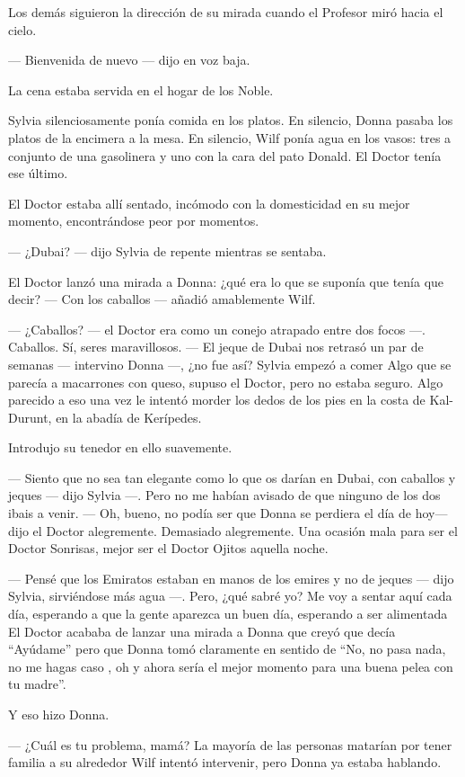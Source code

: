 Los demás siguieron la dirección de su mirada cuando el Profesor miró
hacia el cielo.

--- Bienvenida de nuevo --- dijo en voz baja.

La cena estaba servida en el hogar de los Noble.

Sylvia silenciosamente ponía comida en los platos. En silencio, Donna
pasaba los platos de la encimera a la mesa. En silencio, Wilf ponía agua
en los vasos: tres a conjunto de una gasolinera y uno con la cara del
pato Donald. El Doctor tenía ese último.

El Doctor estaba allí sentado, incómodo con la domesticidad en su mejor
momento, encontrándose peor por momentos.

--- ¿Dubai? --- dijo Sylvia de repente mientras se sentaba.

El Doctor lanzó una mirada a Donna: ¿qué era lo que se suponía que tenía
que decir? --- Con los caballos --- añadió amablemente Wilf.

--- ¿Caballos? --- el Doctor era como un conejo atrapado entre dos focos
---. Caballos. Sí, seres maravillosos. --- El jeque de Dubai nos retrasó
un par de semanas --- intervino Donna ---, ¿no fue así? Sylvia empezó a
comer Algo que se parecía a macarrones con queso, supuso el Doctor, pero
no estaba seguro. Algo parecido a eso una vez le intentó morder los
dedos de los pies en la costa de Kal-Durunt, en la abadía de Kerípedes.

Introdujo su tenedor en ello suavemente.

--- Siento que no sea tan elegante como lo que os darían en Dubai, con
caballos y jeques --- dijo Sylvia ---. Pero no me habían avisado de que
ninguno de los dos ibais a venir. --- Oh, bueno, no podía ser que Donna
se perdiera el día de hoy---dijo el Doctor alegremente. Demasiado
alegremente. Una ocasión mala para ser el Doctor Sonrisas, mejor ser el
Doctor Ojitos aquella noche.

--- Pensé que los Emiratos estaban en manos de los emires y no de jeques
--- dijo Sylvia, sirviéndose más agua ---. Pero, ¿qué sabré yo? Me voy a
sentar aquí cada día, esperando a que la gente aparezca un buen día,
esperando a ser alimentada El Doctor acababa de lanzar una mirada a
Donna que creyó que decía ``Ayúdame'' pero que Donna tomó claramente en
sentido de ``No, no pasa nada, no me hagas caso , oh y ahora sería el
mejor momento para una buena pelea con tu madre''.

Y eso hizo Donna.

--- ¿Cuál es tu problema, mamá? La mayoría de las personas matarían por
tener familia a su alrededor Wilf intentó intervenir, pero Donna ya
estaba hablando.

